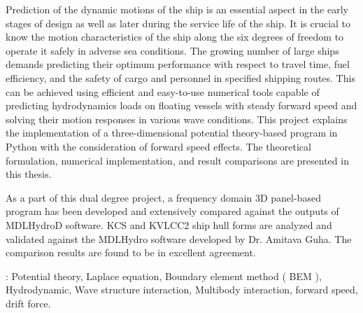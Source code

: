 \abstract
Prediction of the dynamic motions of the ship is an essential aspect in the early stages of design as well as later during the service life of the ship. It is crucial to know the motion characteristics of the ship along the six degrees of freedom to operate it safely in adverse sea conditions. The growing number of large ships demands predicting their optimum performance with respect to travel time, fuel efficiency, and the safety of cargo and personnel in specified shipping routes. This can be achieved using efficient and easy-to-use numerical tools capable of predicting hydrodynamics loads on floating vessels with steady forward speed and solving their motion responses in various wave conditions. This project explains the implementation of a three-dimensional potential theory-based program in Python with the consideration of forward speed effects. The theoretical formulation, numerical implementation, and result comparisons are presented in this thesis.

As a part of this dual degree project, a frequency domain 3D panel-based program has been developed and extensively compared against the outputs of MDLHydroD software. KCS and KVLCC2 ship hull forms are analyzed and validated against the MDLHydro software developed by Dr. Amitava Guha. The comparison results are found to be in excellent agreement.

    
 : Potential theory, Laplace equation, Boundary element method ( BEM ), Hydrodynamic, Wave structure interaction, Multibody interaction, forward speed, drift force.
